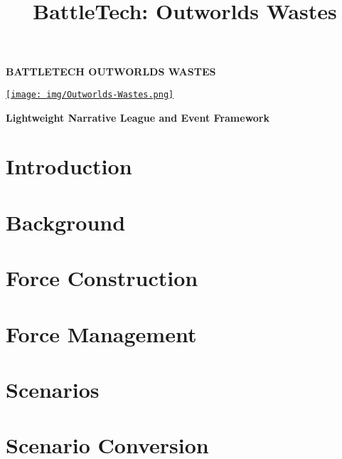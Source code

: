 \documentclass{article}
\title{BattleTech: Outworlds Wastes}
\author{}
\date{}
\newcommand{\mysectiontitle}{}
\newcommand{\newsection}[2]{\renewcommand{\mysectiontitle}{#2}\section{#1}}
\begin{document}
\makeatletter
{}

\begin{center}
  \fontsize{50}{60}\bfseries\selectfont\MakeUppercase{BattleTech}
  \fontsize{30}{37}\bfseries\selectfont\MakeUppercase{Outworlds Wastes}

  \href{https://ko-fi.com/bleptarts}{\texttt{[image: img/Outworlds-Wastes.png]}}

  \LARGE\bfseries{Lightweight Narrative League and Event Framework}
\end{center}

\newsection{Introduction}{introduction}



\newpage

\newsection{Background}{background}



\newsection{Force Construction}{force-construction}



\newpage

\newsection{Force Management}{force-management}



\newpage

\newsection{Scenarios}{scenarios}
\label{sec:scenarios}



\newpage

\newsection{Scenario Conversion}{conversion}
\label{sec:conversion}
\end{document}
